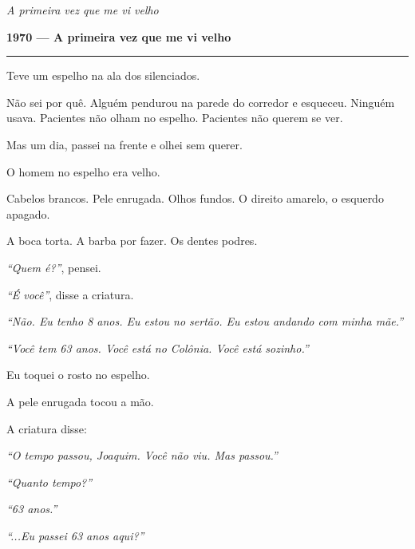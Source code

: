 
\noindent \textit{A primeira vez que me vi velho}

\noindent \textbf{1970 --- A primeira vez que me vi velho}

\vspace{0.5em}\noindent\rule{\textwidth}{0.5pt}\vspace{0.5em}

\noindent Teve um espelho na ala dos silenciados.

\noindent Não sei por quê. Alguém pendurou na parede do corredor e esqueceu. Ninguém usava. Pacientes não olham no espelho. Pacientes não querem se ver.

\noindent Mas um dia, passei na frente e olhei sem querer.

\noindent O homem no espelho era velho.

\noindent Cabelos brancos. Pele enrugada. Olhos fundos. O direito amarelo, o esquerdo apagado.

\noindent A boca torta. A barba por fazer. Os dentes podres.

\noindent \textit{\textquotedblleft{}Quem é?\textquotedblright{}}, pensei.

\noindent \textit{\textquotedblleft{}É você\textquotedblright{}}, disse a criatura.

\noindent \textit{\textquotedblleft{}Não. Eu tenho 8 anos. Eu estou no sertão. Eu estou andando com minha mãe.\textquotedblright{}}

\noindent \textit{\textquotedblleft{}Você tem 63 anos. Você está no Colônia. Você está sozinho.\textquotedblright{}}

\noindent Eu toquei o rosto no espelho.

\noindent A pele enrugada tocou a mão.

\noindent A criatura disse:

\noindent \textit{\textquotedblleft{}O tempo passou, Joaquim. Você não viu. Mas passou.\textquotedblright{}}

\noindent \textit{\textquotedblleft{}Quanto tempo?\textquotedblright{}}

\noindent \textit{\textquotedblleft{}63 anos.\textquotedblright{}}

\noindent \textit{\textquotedblleft{}...Eu passei 63 anos aqui?\textquotedblright{}}

